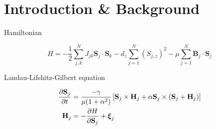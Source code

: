 \section{Introduction \& Background}

Hamiltonian 

\begin{equation}
	H = - \frac{1}{2} \sum_{j,k}^{N} J_{jk} \mathbf{S}_j \cdot \mathbf{S}_k - d_z \sum_{j=1}^{N} (S_{j,z})^2 - \mu \sum_{j=1}^{N} \mathbf{B}_j \cdot \mathbf{S}_j 
\end{equation}

Landau-Lifshitz-Gilbert equation 

\begin{align}
	\frac{\partial \mathbf{S}_j}{\partial t} &= \frac{-\gamma}{\mu(1 + \alpha^2)} \left[ \mathbf{S}_j \times \mathbf{H}_j + \alpha \mathbf{S}_j \times (\mathbf{S}_j + \mathbf{H}_j) \right] \\
	\mathbf{H}_j &= -\frac{\partial H}{\partial \mathbf{S}_j} + \boldsymbol{\xi}_j
\end{align}